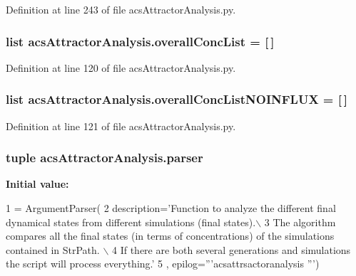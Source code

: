 Definition at line 243 of file acs\-Attractor\-Analysis.\-py.

\hypertarget{a00122_aca1d14f4dbff06c02b0e3e362c7ffe14}{
\subsubsection[{overall\-Conc\-List}]{\setlength{\rightskip}{0pt plus 5cm}list acs\-Attractor\-Analysis.\-overall\-Conc\-List = \mbox{[}$\,$\mbox{]}}}\label{a00122_aca1d14f4dbff06c02b0e3e362c7ffe14}


Definition at line 120 of file acs\-Attractor\-Analysis.\-py.

\hypertarget{a00122_a62444c9b0d66deb07c2e1091695e7561}{
\subsubsection[{overall\-Conc\-List\-N\-O\-I\-N\-F\-L\-U\-X}]{\setlength{\rightskip}{0pt plus 5cm}list acs\-Attractor\-Analysis.\-overall\-Conc\-List\-N\-O\-I\-N\-F\-L\-U\-X = \mbox{[}$\,$\mbox{]}}}\label{a00122_a62444c9b0d66deb07c2e1091695e7561}


Definition at line 121 of file acs\-Attractor\-Analysis.\-py.

\hypertarget{a00122_ab2b01a2d0224ace0cd720a6d807afd0b}{
\subsubsection[{parser}]{\setlength{\rightskip}{0pt plus 5cm}tuple acs\-Attractor\-Analysis.\-parser}}\label{a00122_ab2b01a2d0224ace0cd720a6d807afd0b}
{\bfseries Initial value\-:}
\begin{DoxyCode}
1 = ArgumentParser(
2                                 description=\textcolor{stringliteral}{'Function to analyze the different final dynamical states from
       different simulations (final states).\(\backslash\)}
3 \textcolor{stringliteral}{                                                        The algorithm compares all the final states (in
       terms of concentrations) of the simulations contained in StrPath. \(\backslash\)}
4 \textcolor{stringliteral}{                                                        If there are both several generations and
       simulations the script will process everything.'}
5                                 , epilog=\textcolor{stringliteral}{'''acsattrsactoranalysis '''})
\end{DoxyCode}


